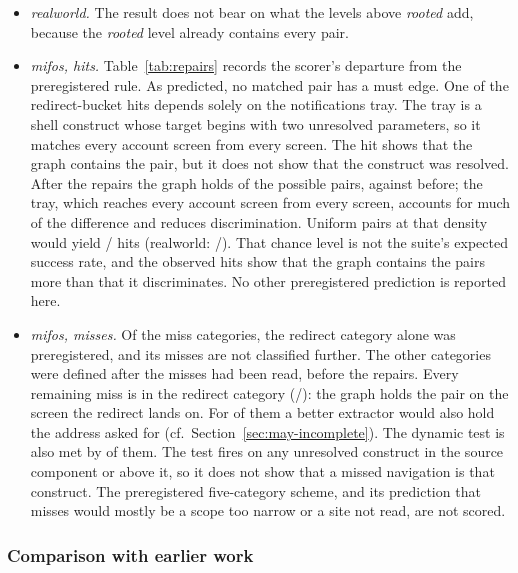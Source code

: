 \begin{itemize}
\item \emph{realworld.} The result does not bear on what the levels above \emph{rooted} add, because the \emph{rooted} level already
contains every pair.
\item \emph{mifos, hits.} Table~\ref{tab:repairs} records the scorer's departure from the
preregistered rule. As predicted, no matched pair has a must edge. One of the
\EtoEMifosHitRedirect{} redirect-bucket hits depends solely on the notifications tray. The tray is a
shell construct whose target begins with two unresolved parameters, so it matches every account
screen from every screen. The hit shows that the graph contains the pair, but it does not show that the construct
was resolved. After the repairs the graph holds \EtoEMifosGraphPairs{} of the \EtoEMifosPossiblePairs{} possible pairs,
against \EtoEMifosGraphPairsUnfixed{} before; the tray, which reaches every account screen from every screen, accounts for much of the difference
and reduces discrimination.
Uniform pairs at that density would yield \EtoEMifosChanceHits{}/\EtoEMifosPairs{} hits (realworld:
\EtoERealworldChanceHits{}/\EtoERealworldPairs{}). That chance level is not the suite's expected
success rate, and the observed hits show that the graph contains the pairs more than that it discriminates. No other
preregistered prediction is reported here.
\item \emph{mifos, misses.} Of the miss categories, the redirect category alone was preregistered, and its
misses are not classified further. The other categories were defined after the misses had been read,
before the repairs. Every remaining miss is in the redirect category
(\EtoEMifosMissRedirect{}/\EtoEMifosMiss{}): the graph holds the pair on the screen the redirect
lands on. For \CeilEtoEMifosInside{} of them a better extractor would also hold the address asked for
(cf.~Section~\ref{sec:may-incomplete}). The dynamic test is also met by \EtoEMifosMissDynamicAny{} of them.
The test fires on any unresolved construct in the source component or above it, so it does not show that
a missed navigation is that construct. The preregistered five-category scheme, and its prediction that
misses would mostly be a scope too narrow or a site not read, are not scored.
\end{itemize}

\subsubsection{Comparison with earlier work}
\label{sec:res-compare}

